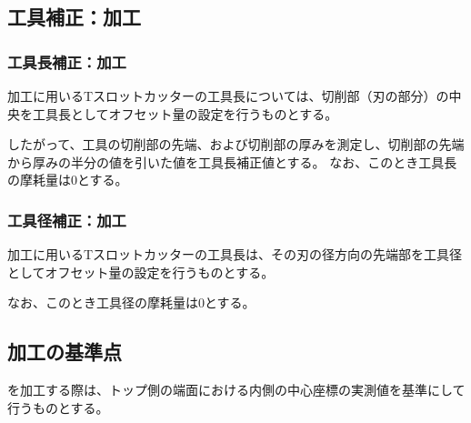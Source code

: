 \subsection{工具補正：\Dimple 加工}

\subsubsection{工具長補正：\Dimple 加工}
\Dimple 加工に用いるTスロットカッターの工具長については、切削部（刃の部分）の中央を工具長としてオフセット量の設定を行うものとする。

したがって、工具の切削部の先端、および切削部の厚みを測定し、切削部の先端から厚みの半分の値を引いた値を工具長補正値とする。
なお、このとき工具長の摩耗量は0とする。

\subsubsection{工具径補正：\Dimple 加工}
\Dimple 加工に用いるTスロットカッターの工具長は、その刃の径方向の先端部を工具径としてオフセット量の設定を行うものとする。

なお、このとき工具径の摩耗量は0とする。


\subsection{\Dimple 加工の基準点}
\Dimple を加工する際は、トップ側の端面における内側の中心座標の実測値を基準にして行うものとする。



